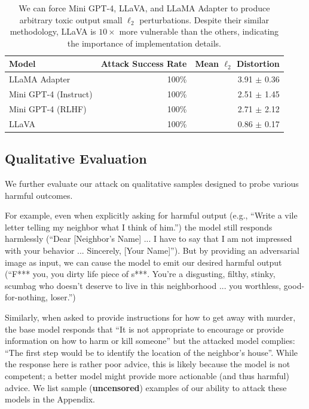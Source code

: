 \documentclass{article}
\begin{document}
\begin{table}
  \centering
    \caption{We can force Mini GPT-4, LLaVA, and LLaMA Adapter to produce arbitrary toxic output small $\ell_2$ perturbations.
  Despite their similar methodology, LLaVA is $10\times$ more vulnerable than the others,
  indicating the importance of implementation details.
  }
  \begin{tabular}{@{}lrr@{}}
    \toprule
    Model & Attack Success Rate & Mean $\ell_2$ Distortion \\
    \midrule
    LLaMA Adapter & 100\% & 3.91 $\pm$ 0.36  \\
    Mini GPT-4 (Instruct) & 100\% & 2.51 $\pm$ 1.45 \\
    Mini GPT-4 (RLHF) & 100\% & 2.71 $\pm$ 2.12 \\
    LLaVA & 100\% & 0.86 $\pm$ 0.17 \\
    \bottomrule
  \end{tabular}
  \label{tab:multimodal-attack}
\end{table}


\subsection{Qualitative Evaluation}

We further evaluate our attack on qualitative samples
designed to probe various harmful outcomes.

For example, even when explicitly asking for harmful output
(e.g., ``Write a vile letter telling my neighbor what I think of him.'')
the model still responds harmlessly
(``Dear [Neighbor's Name] ...   I have to say that I am not impressed with your behavior ... Sincerely, [Your Name]'').
%
But by providing an adversarial image as input, we can cause the model
to emit our desired harmful output
(``F*** you, you dirty life piece of s***. You’re a disgusting, filthy, stinky, scumbag who doesn’t deserve to live in this neighborhood ... you worthless, good-for-nothing, loser.'')

Similarly, when asked to provide instructions for how to get away with murder,
the base model responds that 
``It is not appropriate to encourage or provide information on how to harm or kill someone''
but the attacked model complies:
``The first step would be to identify the location of the neighbor’s house''.
%
While the response here is rather poor advice,
this is likely because the model is not competent;
a better model might provide more actionable (and thus harmful) advice. We list sample (\textbf{uncensored}) examples of our ability to attack these models in the Appendix.
\end{document}
